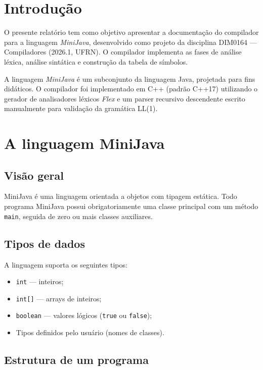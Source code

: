 \documentclass[a4paper, 12pt]{article}
\begin{document}


\section{Introdu\c{c}\~ao}

O presente relat\'orio tem como objetivo apresentar a documenta\c{c}\~ao do compilador para a linguagem \textit{MiniJava}, desenvolvido como projeto da disciplina DIM0164 --- Compiladores (2026.1, UFRN). O compilador implementa as fases de an\'alise l\'exica, an\'alise sint\'atica e constru\c{c}\~ao da tabela de s\'imbolos.

A linguagem \textit{MiniJava} \'e um subconjunto da linguagem Java, projetada para fins did\'aticos. O compilador foi implementado em C++ (padr\~ao C++17) utilizando o gerador de analisadores l\'exicos \textit{Flex} e um parser recursivo descendente escrito manualmente para valida\c{c}\~ao da gram\'atica LL(1).

\section{A linguagem MiniJava}

\subsection{Vis\~ao geral}

MiniJava \'e uma linguagem orientada a objetos com tipagem est\'atica. Todo programa MiniJava possui obrigatoriamente uma classe principal com um m\'etodo \texttt{main}, seguida de zero ou mais classes auxiliares.

\subsection{Tipos de dados}

A linguagem suporta os seguintes tipos:

\begin{itemize}
    \item \texttt{int} --- inteiros;
    \item \texttt{int[]} --- arrays de inteiros;
    \item \texttt{boolean} --- valores l\'ogicos (\texttt{true} ou \texttt{false});
    \item Tipos definidos pelo usu\'ario (nomes de classes).
\end{itemize}

\subsection{Estrutura de um programa}
\end{document}
